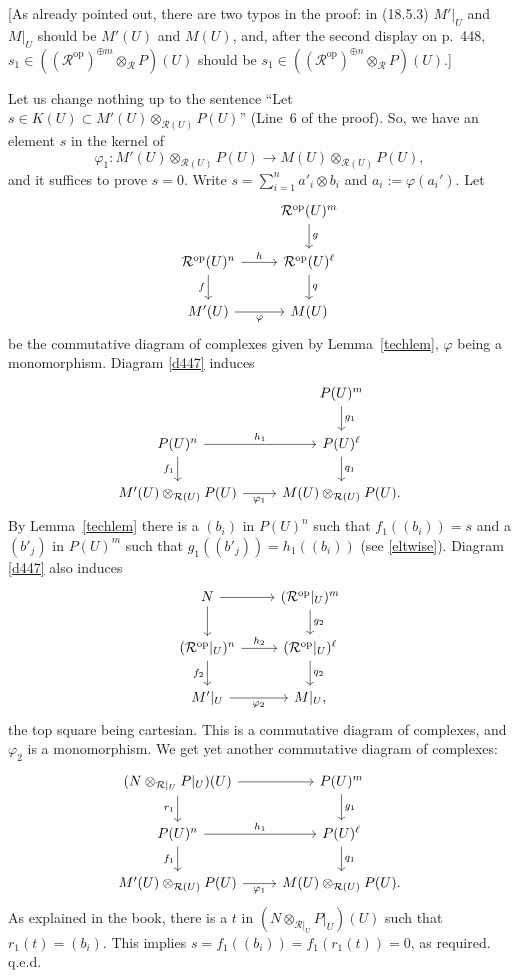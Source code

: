 \documentclass[12pt]{article}
\theoremstyle{remark}
\theoremstyle{definition}
\newcommand{\cc}{\mathcal}
\DeclareMathOperator{\op}{op}
\begin{document}
[As already pointed out, there are two typos in the proof: in (18.5.3) $M'|_U$ and $M|_U$ should be $M'(U)$ and $M(U)$, and, after the second display on p.~448, $s_1\in((\cc R^{\op})^{\oplus m}\otimes_{\cc R}P)(U)$ should be $s_1\in((\cc R^{\op})^{\oplus n}\otimes_{\cc R}P)(U)$.]

Let us change nothing up to the sentence ``Let $s\in K(U)\subset M'(U)\otimes_{\cc R(U)}P(U)$'' (Line~6 of the proof). So, we have an element $s$ in the kernel of 
$$
\varphi_1:M'(U)\otimes_{\cc R(U)}P(U)\to M(U)\otimes_{\cc R(U)}P(U),
$$ 
and it suffices to prove $s=0$. Write $s=\sum_{i=1}^na'_i\otimes b_i$ and $a_i:=\varphi(a_i')$. Let
%
\begin{equation}\label{d447}
\begin{tikzcd}
{}&\cc R^{\op}(U)^m\ar{d}{g}\\ 
\cc R^{\op}(U)^n\ar{r}{h}\ar{d}[swap]{f}&\cc R^{\op}(U)^\ell\ar{d}{q}\\ 
M'(U)\ar{r}[swap]{\varphi}&M(U)
\end{tikzcd}
\end{equation}
%
be the commutative diagram of complexes given by Lemma~\ref{techlem}, $\varphi$ being a monomorphism. Diagram \eqref{d447} induces
$$
\begin{tikzcd}
{}&P(U)^m\ar{d}{g_1}\\ 
P(U)^n\ar{r}{h_1}\ar{d}[swap]{f_1}&P(U)^\ell\ar{d}{q_1}\\ 
M'(U)\otimes_{\cc R(U)}P(U)\ar{r}[swap]{\varphi_1}&M(U)\otimes_{\cc R(U)}P(U).
\end{tikzcd}
$$ 
By Lemma~\ref{techlem} there is a $(b_i)$ in $P(U)^n$ such that $f_1((b_i))=s$ and a $(b'_j)$ in $P(U)^m$ such that $g_1((b'_j))=h_1((b_i))$ (see \eqref{eltwise}). Diagram \eqref{d447} also induces
$$
\begin{tikzcd}
N\ar{r}\ar{d}&(\cc R^{\op}|_U)^m\ar{d}{g_2}\\ 
(\cc R^{\op}|_U)^n\ar{r}{h_2}\ar{d}[swap]{f_2}&(\cc R^{\op}|_U)^\ell\ar{d}{q_2}\\ 
M'|_U\ar{r}[swap]{\varphi_2}&M|_U,
\end{tikzcd}
$$ 
the top square being cartesian. This is a commutative diagram of complexes, and $\varphi_2$ is a monomorphism. We get yet another commutative diagram of complexes:
$$
\begin{tikzcd}
(N\otimes_{\cc R|_U}P|_U)(U)\ar{r}\ar{d}[swap]{r_1}&P(U)^m\ar{d}{g_1}\\ 
P(U)^n\ar{r}{h_1}\ar{d}[swap]{f_1}&P(U)^\ell\ar{d}{q_1}\\ 
M'(U)\otimes_{\cc R(U)}P(U)\ar{r}[swap]{\varphi_1}&M(U)\otimes_{\cc R(U)}P(U).
\end{tikzcd}
$$ 
As explained in the book, there is a $t$ in $(N\otimes_{\cc R|_U}P|_U)(U)$ such that $r_1(t)=(b_i)$. This implies $s=f_1((b_i))=f_1(r_1(t))=0$, as required. q.e.d.
%
%
%
%
\end{document}

